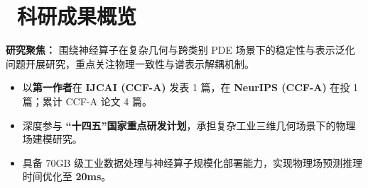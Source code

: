 \documentclass[11pt]{article}
\begin{document}
\section{\makebox[\widthof{\faBookmark}][c]{\color{CVBlue}\faBookmark}\ 科研成果概览} 

\textbf{研究聚焦：} 围绕神经算子在复杂几何与跨类别 PDE 场景下的稳定性与表示泛化问题开展研究，重点关注物理一致性与谱表示解耦机制。

\begin{itemize}[leftmargin=1.5em]
    \item 以\textbf{第一作者}在 \textbf{IJCAI (CCF-A)} 发表 1 篇，在 \textbf{NeurIPS (CCF-A)} 在投 1 篇；累计 CCF-A 论文 4 篇。
    \item 深度参与 \textbf{“十四五”国家重点研发计划}，承担复杂工业三维几何场景下的物理场建模研究。
    \item 具备 70GB 级工业数据处理与神经算子规模化部署能力，实现物理场预测推理时间优化至 \textbf{20ms}。
\end{itemize}


\end{document}
